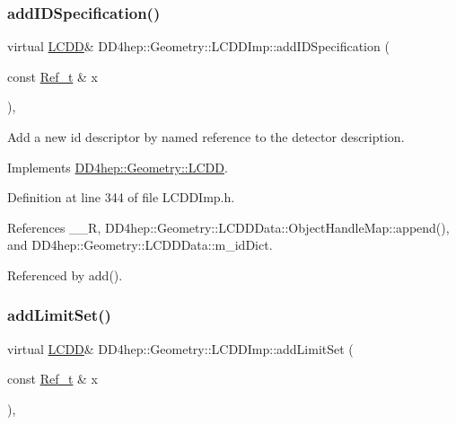 \subsubsection{\texorpdfstring{add\+I\+D\+Specification()}{addIDSpecification()}}
{\footnotesize\ttfamily virtual \hyperlink{class_d_d4hep_1_1_geometry_1_1_l_c_d_d}{L\+C\+DD}\& D\+D4hep\+::\+Geometry\+::\+L\+C\+D\+D\+Imp\+::add\+I\+D\+Specification (\begin{DoxyParamCaption}\item[{const \hyperlink{group___d_d4_h_e_p___g_e_o_m_e_t_r_y_ga40af83be6718bb8828a3d83dc7f8c930}{Ref\+\_\+t} \&}]{x }\end{DoxyParamCaption})\hspace{0.3cm}{\ttfamily [inline]}, {\ttfamily [virtual]}}



Add a new id descriptor by named reference to the detector description. 



Implements \hyperlink{class_d_d4hep_1_1_geometry_1_1_l_c_d_d_a93f80b4976e72a8a64d73baa6cf50a4d}{D\+D4hep\+::\+Geometry\+::\+L\+C\+DD}.



Definition at line 344 of file L\+C\+D\+D\+Imp.\+h.



References \+\_\+\+\_\+R, D\+D4hep\+::\+Geometry\+::\+L\+C\+D\+D\+Data\+::\+Object\+Handle\+Map\+::append(), and D\+D4hep\+::\+Geometry\+::\+L\+C\+D\+D\+Data\+::m\+\_\+id\+Dict.



Referenced by add().

\hypertarget{class_d_d4hep_1_1_geometry_1_1_l_c_d_d_imp_a846ba4e66d0a38eddaae795bf4b4b43b}{}\label{class_d_d4hep_1_1_geometry_1_1_l_c_d_d_imp_a846ba4e66d0a38eddaae795bf4b4b43b} 
\subsubsection{\texorpdfstring{add\+Limit\+Set()}{addLimitSet()}}
{\footnotesize\ttfamily virtual \hyperlink{class_d_d4hep_1_1_geometry_1_1_l_c_d_d}{L\+C\+DD}\& D\+D4hep\+::\+Geometry\+::\+L\+C\+D\+D\+Imp\+::add\+Limit\+Set (\begin{DoxyParamCaption}\item[{const \hyperlink{group___d_d4_h_e_p___g_e_o_m_e_t_r_y_ga40af83be6718bb8828a3d83dc7f8c930}{Ref\+\_\+t} \&}]{x }\end{DoxyParamCaption})\hspace{0.3cm}{\ttfamily [inline]}, {\ttfamily [virtual]}}



